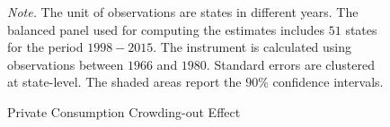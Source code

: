 \documentclass[dv_diss_main.tex]{subfiles}
\begin{document}
\begin{figure}[ht]
\begin{center}
\begin{tabular}[c]{ccc}
    
    \end{tabular}
    \end{center}
    
    
    \caption{Private Consumption Crowding-out Effect}
    
    \footnotesize{\textit{Note. } The unit of observations are states in different years. The balanced panel used for computing the estimates includes $51$ states for the period $1998-2015$. The instrument is calculated using observations between $1966$ and $1980$. Standard errors are clustered at state-level. The shaded areas report the $90\%$ confidence intervals.}

    \label{fig:crowd_privcons}
\end{figure}
\newpage


\newpage
\end{document}
